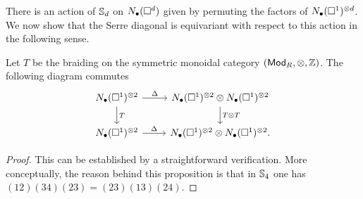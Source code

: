 There is an action of $\S_d$ on $\chains(\square^d)$ given by permuting the factors of $\chains(\square^1)^{\otimes d}$.
We now show that the Serre diagonal is equivariant with respect to this action in the following sense.

\begin{proposition} \label{p:serre diagonal invariant}
	Let $T$ be the braiding on the symmetric monoidal category $(\Ch, \otimes, \Z)$. The following diagram commutes
	\begin{equation*}
	\begin{tikzcd}
	\chains(\square^1)^{\otimes 2} \arrow[r, "\Delta"] \arrow[d, "T"] &
	\chains(\square^1)^{\otimes 2} \otimes \chains(\square^1)^{\otimes 2} \arrow[d, "T \otimes T"] \\
	\chains(\square^1)^{\otimes 2} \arrow[r, "\Delta"] &
	\chains(\square^1)^{\otimes 2} \otimes \chains(\square^1)^{\otimes 2}.
	\end{tikzcd}
	\end{equation*}
\end{proposition}

\begin{proof}
	This can be established by a straightforward verification. More conceptually, the reason behind this proposition is that in $\S_4$ one has $(12)(34)(23) = (23)(13)(24)$.
\end{proof}